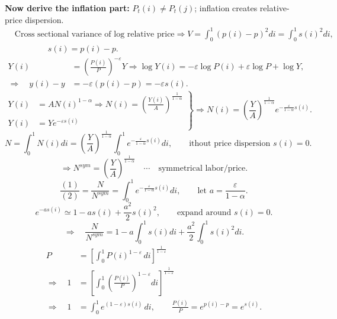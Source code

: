 \documentclass[11pt,fleqn]{article}
\begin{document}
\textbf{Now derive the inflation part:} $P_t\left(i\right)\neq P_t\left(j\right)$; inflation creates relative-price dispersion.
\[
\begin{aligned}
&\text{Cross sectional variance of log relative price}\Rightarrow
V=\int_0^1\left(p\left(i\right)-p\right)^2di=\int_0^1s\left(i\right)^2di,\\[-1pt]
&\hspace{4em} s\left(i\right)=p\left(i\right)-p.
\end{aligned}
\]
\begin{align*}
Y\left(i\right)&=\left(\frac{P\left(i\right)}{P}\right)^{-\varepsilon}Y
\Rightarrow \log Y\left(i\right)=-\varepsilon\log P\left(i\right)+\varepsilon\log P+\log Y,\\[-1pt]
\Rightarrow\quad y\left(i\right)-y&=-\varepsilon\left(p\left(i\right)-p\right)=-\varepsilon s\left(i\right).
\end{align*}
\[
\left.
\begin{aligned}
Y\left(i\right)&=A N\left(i\right)^{1-\alpha}
\Rightarrow
N\left(i\right)=\left(\frac{Y\left(i\right)}{A}\right)^{\frac{1}{1-\alpha}}\\
Y\left(i\right)&=Ye^{-\varepsilon s\left(i\right)}
\end{aligned}
\right\}
\Rightarrow
N\left(i\right)=\left(\frac{Y}{A}\right)^{\frac{1}{1-\alpha}}
e^{-\frac{\varepsilon}{1-\alpha}s\left(i\right)}.
\]
\[
N=\int_0^1N\left(i\right)di=\left(\frac{Y}{A}\right)^{\frac{1}{1-\alpha}}
\int_0^1e^{-\frac{\varepsilon}{1-\alpha}s\left(i\right)}di,
\qquad
\tag{1}
\text{ithout price dispersion }s\left(i\right)=0.
\]
\[
\Rightarrow
N^{sym}=\left(\frac{Y}{A}\right)^{\frac{1}{1-\alpha}}
\tag{2}
\quad\cdots\quad \text{symmetrical labor/price.}
\]
\[
\frac{\left(1\right)}{\left(2\right)}=\frac{N}{N^{sym}}=\int_0^1e^{-\frac{\varepsilon}{1-\alpha}s\left(i\right)}di,
\qquad
\text{let }a=\frac{\varepsilon}{1-\alpha}.
\]
\[
e^{-as\left(i\right)}\simeq1-as\left(i\right)+\frac{a^2}{2}s\left(i\right)^2,
\qquad\text{expand around }s\left(i\right)=0.
\]
\[
\Rightarrow\quad
\frac{N}{N^{sym}}=1-a\int_0^1s\left(i\right)di+\frac{a^2}{2}\int_0^1s\left(i\right)^2di.\tag{$\ast\ast\ast$}
\]
\begin{align*}
P
&=
\left[
\int_0^1 P\left(i\right)^{1-\varepsilon}\,di
\right]^{\frac{1}{1-\varepsilon}}
\\[2pt]
\Rightarrow\quad
1
&=
\left[
\int_0^1
\left(\frac{P\left(i\right)}{P}\right)^{1-\varepsilon}
di
\right]^{\frac{1}{1-\varepsilon}}
\\[2pt]
\Rightarrow\quad
1
&=
\int_0^1 e^{\left(1-\varepsilon\right)s\left(i\right)}\,di,
\qquad
\frac{P\left(i\right)}{P}
=
e^{p\left(i\right)-p}
=
e^{s\left(i\right)}.
\end{align*}
\end{document}
